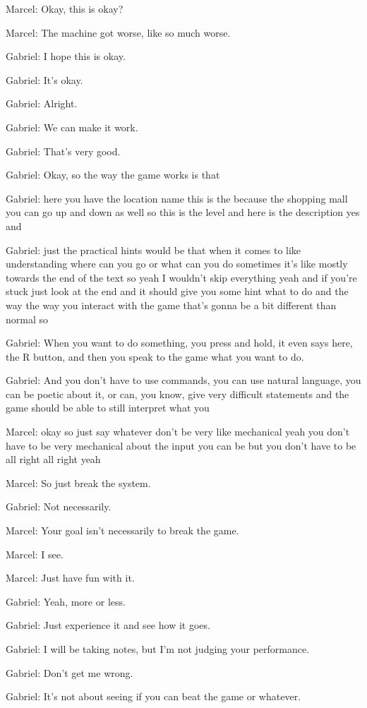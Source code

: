 Marcel: Okay, this is okay?

Marcel: The machine got worse, like so much worse.

Gabriel: I hope this is okay.

Gabriel: It's okay.

Gabriel: Alright.

Gabriel: We can make it work.

Gabriel: That's very good.

Gabriel: Okay, so the way the game works is that

Gabriel: here you have the location name this is the because the shopping mall you can go up and down as well so this is the level and here is the description yes and

Gabriel: just the practical hints would be that when it comes to like understanding where can you go or what can you do sometimes it's like mostly towards the end of the text so yeah I wouldn't skip everything yeah and if you're stuck just look at the end and it should give you some hint what to do and the way the way you interact with the game that's gonna be a bit different than normal so

Gabriel: When you want to do something, you press and hold, it even says here, the R button, and then you speak to the game what you want to do.

Gabriel: And you don't have to use commands, you can use natural language, you can be poetic about it, or can, you know, give very difficult statements and the game should be able to still interpret what you

Marcel: okay so just say whatever don't be very like mechanical yeah you don't have to be very mechanical about the input you can be but you don't have to be all right all right yeah

Marcel: So just break the system.

Gabriel: Not necessarily.

Marcel: Your goal isn't necessarily to break the game.

Marcel: I see.

Marcel: Just have fun with it.

Gabriel: Yeah, more or less.

Gabriel: Just experience it and see how it goes.

Gabriel: I will be taking notes, but I'm not judging your performance.

Gabriel: Don't get me wrong.

Gabriel: It's not about seeing if you can beat the game or whatever.

